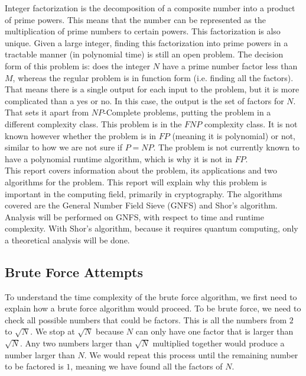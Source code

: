 Integer factorization is the decomposition of a composite number into a product of prime powers. This means that the number can be represented as the multiplication of prime numbers to certain powers. This factorization is also unique. Given a large integer, finding this factorization into prime powers in a tractable manner (in polynomial time) is still an open problem. The decision form of this problem is: does the integer $N$ have a prime number factor less than $M$, whereas the regular problem is in function form (i.e. finding all the factors). That means there is a single output for each input to the problem, but it is more complicated than a yes or no. In this case, the output is the set of factors for $N$. That sets it apart from $NP$-Complete problems, putting the problem in a different complexity class. This problem is in the $FNP$ complexity class. It is not known however whether the problem is in $FP$ (meaning it is polynomial) or not, similar to how we are not sure if $P = NP$. The problem is not currently known to have a polynomial runtime algorithm, which is why it is not in $FP$. \\

This report covers information about the problem, its applications and two algorithms for the problem. This report will explain why this problem is important in the computing field, primarily in cryptography. The algorithms covered are the General Number Field Sieve (GNFS) and Shor’s algorithm. Analysis will be performed on GNFS, with respect to time and runtime complexity. With Shor’s algorithm, because it requires quantum computing, only a theoretical analysis will be done.


\subsection{Brute Force Attempts}
	To understand the time complexity of the brute force algorithm, we first need to explain how a brute force algorithm would proceed. To be brute force, we need to check all possible numbers that could be factors. This is all the numbers from $2$ to $\sqrt{N}$. We stop at $\sqrt{N}$ because $N$ can only have one factor that is larger than $\sqrt{N}$. Any two numbers larger than $\sqrt{N}$ multiplied together would produce a number larger than $N$. We would repeat this process until the remaining number to be factored is $1$, meaning we have found all the factors of $N$. \\

